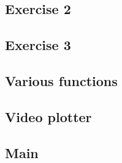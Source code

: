 \documentclass{article}
\begin{document}
\subsection{Exercise 2}


\subsection{Exercise 3}


\subsection{Various functions}


\subsection{Video plotter}


\subsection{Main}

\end{document}
